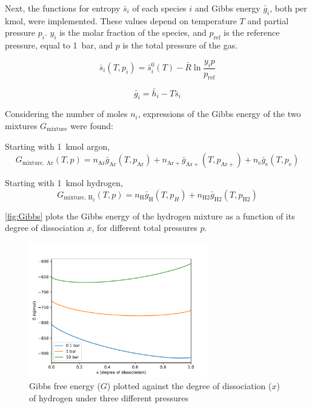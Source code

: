         Next, the functions for entropy $\bar s_i$ of each species $i$ and Gibbs energy $\bar g_i$, both per \unit{kmol}, were implemented. These values depend on temperature $T$ and partial pressure $p_i$. $y_i$ is the molar fraction of the species, and $p_\mathrm{ref}$ is the reference pressure, equal to \qty{1}{bar}, and $p$ is the total pressure of the gas.
        
        \begin{equation}
            \bar s_i (T, p_i) = \bar s_i^0 (T) - \bar R \ln \frac{y_i p}{p_\mathrm{ref}}
        \end{equation}

        \begin{equation}
            \bar g_i = \bar h_i - T \bar s_i
        \end{equation}

        Considering the number of moles $n_i$, expressions of the Gibbs energy of the two mixtures $G_\mathrm{mixture}$ were found:

        Starting with \qty{1}{kmol} argon,
        \begin{equation}
            G_\mathrm{mixture,\: Ar}(T, p) = n_\mathrm{Ar} \bar g_\mathrm{Ar}(T, p_\mathrm{Ar}) + n_\mathrm{Ar+} \bar g_\mathrm{Ar+}(T, p_\mathrm{Ar+}) + n_\mathrm{e} \bar g_\mathrm{e}(T, p_\mathrm{e})
        \end{equation}

        Starting with \qty{1}{kmol} hydrogen,
        \begin{equation}
            G_\mathrm{mixture,\: H_2}(T, p) = n_\mathrm{H} \bar g_\mathrm{H}(T, p_H) + n_\mathrm{H2} \bar g_\mathrm{H2}(T, p_\mathrm{H2})
        \end{equation}

        \autoref{fig:Gibbs} plots the Gibbs energy of the hydrogen mixture as a function of its degree of dissociation $x$, for different total pressures $p$.

        \begin{figure}[!ht]
            \centering
            \includegraphics[width=0.7\textwidth]{assets/2 models/Gibbs.pdf}
            \caption{Gibbs free energy ($G$) plotted against the degree of dissociation ($x$) of hydrogen under three different pressures}
            \label{fig:Gibbs}
        \end{figure}

